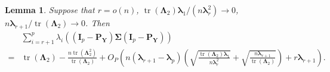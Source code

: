 \documentclass[10pt]{book}
\newtheorem{lemma}{Lemma}
\theoremstyle{definition}
\DeclareMathOperator{\mytr}{tr}
\newcommand{\bP}{\mathbf{P}}
\newcommand{\bY}{\mathbf{Y}}
\newcommand{\bI}{\mathbf{I}}
\newcommand{\bfsym}[1]{\ensuremath{\boldsymbol{#1}}}
\def\blambda {\bfsym {\lambda}}
\def\bLambda {\bfsym {\Lambda}}
\def\bSigma {\bfsym {\Sigma}}
\begin{document}
\begin{lemma}\label{gg:Lemmac}
    Suppose that
    $r=o(n)$, $\mytr(\bLambda_2)\blambda_1/(n\blambda_r^2)\to 0$,
    $n\blambda_{r+1}/\mytr(\bLambda_2)\to 0$.
    Then
\begin{equation*}
    \begin{split}
        &
        \sum_{i=r+1}^{p}\lambda_i\left(
         (\bI_p -\bP_\bY)\bSigma (\bI_p- \bP_{\bY})
    \right)
    \\
    =&\mytr(\bLambda_2)-\frac{n\mytr(\bLambda_2^2)}{\mytr(\bLambda_2)}
    +
    O_P\left(n(\blambda_{r+1}-\blambda_p)\left(\sqrt{\frac{\mytr(\bLambda_2)\blambda_1}{n\blambda_r^2}}+\sqrt{\frac{n\blambda_{r+1}}{\mytr(\bLambda_2)}}\right)
    +r\blambda_{r+1}
    \right).
    \end{split}
\end{equation*}
\end{lemma}
\end{document}
